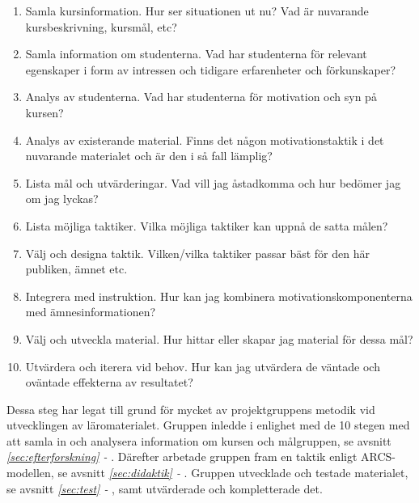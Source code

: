 \documentclass[12pt,a4paper,twoside,openright]{article}
\begin{document}
\begin{enumerate}
\item Samla kursinformation. Hur ser situationen ut nu? Vad är
 nuvarande kursbeskrivning, kursmål, etc?

\item Samla information om studenterna. Vad har studenterna
 för relevant egenskaper i form av intressen och tidigare
 erfarenheter och förkunskaper?

\item Analys av studenterna. Vad har studenterna för motivation och
 syn på kursen?

\item Analys av existerande material. Finns det någon
 motivationstaktik i det nuvarande materialet och är den i så fall
 lämplig?

\item Lista mål och utvärderingar. Vad vill jag åstadkomma och hur
 bedömer jag om jag lyckas?

\item Lista möjliga taktiker. Vilka möjliga taktiker kan uppnå de
 satta målen?

\item Välj och designa taktik. Vilken/vilka taktiker passar bäst för
 den här publiken, ämnet etc.

\item Integrera med instruktion. Hur kan jag kombinera
 motivationskomponenterna med ämnesinformationen?

\item Välj och utveckla material. Hur hittar eller skapar jag material
 för dessa mål?

\item Utvärdera och iterera vid behov. Hur kan jag utvärdera de
 väntade och oväntade effekterna av resultatet?

\end{enumerate}

Dessa steg har legat till grund för mycket av projektgruppens metodik
vid utvecklingen av läromaterialet. Gruppen inledde i enlighet med de
10 stegen med att samla in och analysera information om kursen och
målgruppen, se avsnitt \textit{\ref{sec:efterforskning} -
  }. Därefter arbetade gruppen fram en
taktik enligt ARCS-modellen, se avsnitt \textit{\ref{sec:didaktik} -
  }. Gruppen utvecklade och testade materialet,
se avsnitt \textit{\ref{sec:test} - }, samt
utvärderade och kompletterade det.
\end{document}
